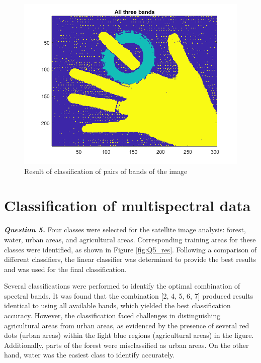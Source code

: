 \documentclass[12pt]{article}
\begin{document}
\begin{figure}[htbp!]
  \centering
  \includegraphics[width = 15cm]{images/Q4_3b.png}
  \caption{Result of classification of pairs of bands of the image}
  \label{fig:Q4_3}
\end{figure}

\section{Classification of multispectral data}
\textbf{\emph{Question 5.}}
Four classes were selected for the satellite image analysis: forest, water, urban areas, and agricultural areas. Corresponding training areas for these classes were identified, as shown in Figure \ref{fig:Q5_res}. Following a comparison of different classifiers, the linear classifier was determined to provide the best results and was used for the final classification.

Several classifications were performed to identify the optimal combination of spectral bands. It was found that the combination [2, 4, 5, 6, 7] produced results identical to using all available bands, which yielded the best classification accuracy. However, the classification faced challenges in distinguishing agricultural areas from urban areas, as evidenced by the presence of several red dots (urban areas) within the light blue regions (agricultural areas) in the figure. Additionally, parts of the forest were misclassified as urban areas. On the other hand, water was the easiest class to identify accurately.
\end{document}
